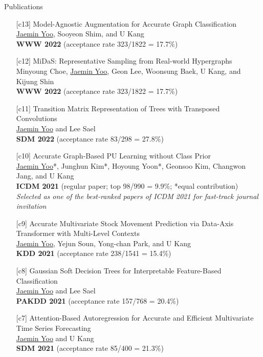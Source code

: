 \documentclass{resume} %
\begin{document}
\begin{rSection}{Publications}
\begin{enumerate}[leftmargin=*]
	\item[{[c13]}]
		Model-Agnostic Augmentation for Accurate Graph Classification \\
		\underline{Jaemin Yoo}, Sooyeon Shim, and U Kang \\
		\textbf{WWW 2022} (acceptance rate 323/1822 = 17.7\%) \\

	\item[{[c12]}]
		MiDaS: Representative Sampling from Real-world Hypergraphs \\
		Minyoung Choe, \underline{Jaemin Yoo}, Geon Lee, Woonsung Baek, U Kang, and Kijung Shin \\
		\textbf{WWW 2022} (acceptance rate 323/1822 = 17.7\%) \\

	\item[{[c11]}]
		Transition Matrix Representation of Trees with Transposed Convolutions \\
		\underline{Jaemin Yoo} and Lee Sael \\
		\textbf{SDM 2022} (acceptance rate 83/298 = 27.8\%) \\

	\item[{[c10]}]
		Accurate Graph-Based PU Learning without Class Prior \\
		\underline{Jaemin Yoo}*, Junghun Kim*, Hoyoung Yoon*, Geonsoo Kim, Changwon Jang, and U Kang \\
		\textbf{ICDM 2021} (regular paper; top 98/990 = 9.9\%; *equal contribution) \\
		\emph{Selected as one of the best-ranked papers of ICDM 2021 for fast-track journal invitation}

	\item[{[c9]}]
		Accurate Multivariate Stock Movement Prediction via Data-Axis Transformer with Multi-Level Contexts  \\
		\underline{Jaemin Yoo}, Yejun Soun, Yong-chan Park, and U Kang \\
		\textbf{KDD 2021} (acceptance rate 238/1541 = 15.4\%)

	\item[{[c8]}]
		Gaussian Soft Decision Trees for Interpretable Feature-Based Classification \\
		\underline{Jaemin Yoo} and Lee Sael \\
		\textbf{PAKDD 2021} (acceptance rate 157/768 = 20.4\%)
		
	\item[{[c7]}]
		Attention-Based Autoregression for Accurate and Efficient Multivariate Time Series Forecasting \\
		\underline{Jaemin Yoo} and U Kang \\
		\textbf{SDM 2021} (acceptance rate 85/400 = 21.3\%)


\end{enumerate}
\end{rSection}
\end{document}
